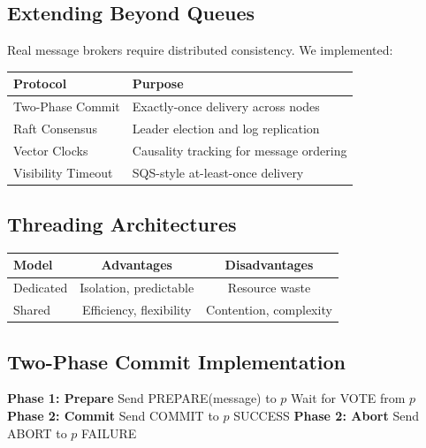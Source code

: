\documentclass[11pt,a4paper]{article}
\begin{document}
\subsection{Extending Beyond Queues}

Real message brokers require distributed consistency. We implemented:

\begin{center}
\begin{tabular}{ll}
\toprule
\textbf{Protocol} & \textbf{Purpose} \\
\midrule
Two-Phase Commit & Exactly-once delivery across nodes \\
Raft Consensus & Leader election and log replication \\
Vector Clocks & Causality tracking for message ordering \\
Visibility Timeout & SQS-style at-least-once delivery \\
\bottomrule
\end{tabular}
\end{center}

\subsection{Threading Architectures}

\begin{center}
\begin{tabular}{lcc}
\toprule
\textbf{Model} & \textbf{Advantages} & \textbf{Disadvantages} \\
\midrule
Dedicated & Isolation, predictable & Resource waste \\
Shared & Efficiency, flexibility & Contention, complexity \\
\bottomrule
\end{tabular}
\end{center}

\subsection{Two-Phase Commit Implementation}

\begin{algorithm}
\caption{Two-Phase Commit Protocol}
\begin{algorithmic}[1]
\State \textbf{Phase 1: Prepare}
    \State Send PREPARE(message) to $p$
    \State Wait for VOTE from $p$
\EndFor
{}
    \State \textbf{Phase 2: Commit}
        \State Send COMMIT to $p$
    \EndFor
    \State \Return SUCCESS
\Else
    \State \textbf{Phase 2: Abort}
        \State Send ABORT to $p$
    \EndFor
    \State \Return FAILURE
\EndIf
\EndProcedure
\end{algorithmic}
\end{algorithm}
\end{document}
